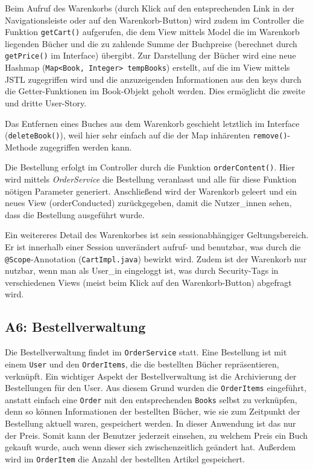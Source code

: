 	Beim Aufruf des Warenkorbs (durch Klick auf den entsprechenden Link in der Navigationsleiste oder auf den Warenkorb-Button) wird zudem im Controller die Funktion \lstinline|getCart()| aufgerufen, die dem View mittels Model die im Warenkorb liegenden Bücher und die zu zahlende Summe der Buchpreise (berechnet durch \lstinline|getPrice()| im Interface) übergibt. Zur Darstellung der Bücher wird eine neue Hashmap (\lstinline|Map<Book, Integer> tempBooks|) erstellt, auf die im View mittels JSTL zugegriffen wird und die anzuzeigenden Informationen aus den keys durch die Getter-Funktionen im Book-Objekt geholt werden. Dies ermöglicht die zweite und dritte User-Story.
	
	Das Entfernen eines Buches aus dem Warenkorb geschieht letztlich im Interface (\lstinline|deleteBook()|), weil hier sehr einfach auf die der Map inhärenten \lstinline|remove()|-Me\-tho\-de zugegriffen werden kann.
	
	Die Bestellung erfolgt im Controller durch die Funktion \lstinline|orderContent()|. Hier wird mittels \textit{OrderService} die Bestellung veranlasst und alle für diese Funktion nötigen Parameter generiert. Anschließend wird der Warenkorb geleert und ein neues View (orderConducted) zurückgegeben, damit die Nutzer\_innen sehen, dass die Bestellung ausgeführt wurde.
	
	Ein weitereres Detail des Warenkorbes ist sein sessionabhängiger Geltungsbereich. Er ist innerhalb einer Session unverändert aufruf- und benutzbar, was durch die \lstinline|@Scope|-Annotation (\lstinline|CartImpl.java|) bewirkt wird. Zudem ist der Warenkorb nur nutzbar, wenn man als User\_in eingeloggt ist, was durch Security-Tags in verschiedenen Views (meist beim Klick auf den Warenkorb-Button) abgefragt wird.
	
	\subsection{A6: Bestellverwaltung}\label{sec:umsetzung:Bestellverwaltung}
	Die Bestellverwaltung findet im \texttt{OrderService} statt. Eine Bestellung ist mit einem \texttt{User} und den \texttt{OrderItems}, die die bestellten Bücher repräsentieren, verknüpft. Ein wichtiger Aspekt der Bestellverwaltung ist die Archivierung der Bestellungen für den User. Aus diesem Grund wurden die \texttt{OrderItems} eingeführt, anstatt einfach eine \texttt{Order} mit den entsprechenden \texttt{Books} selbst zu verknüpfen, denn so können Informationen der bestellten Bücher, wie sie zum Zeitpunkt der Bestellung aktuell waren, gespeichert werden. In dieser Anwendung ist das nur der Preis. Somit kann der Benutzer jederzeit einsehen, zu welchem Preis ein Buch gekauft wurde, auch wenn dieser sich zwischenzeitlich geändert hat. Außerdem wird im \texttt{OrderItem} die Anzahl der bestellten Artikel gespeichert.
	

